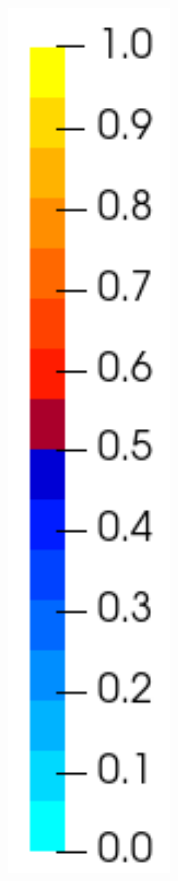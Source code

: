 \begin{figure}[!htb]
\begin{subfigure}[b]{0.1\textwidth}
    \includegraphics[width=0.47\textwidth]{Chapter5/figures/spallation/colorbar_c_inv}
    \vspace{3em}
  \end{subfigure}
  

\end{figure}
